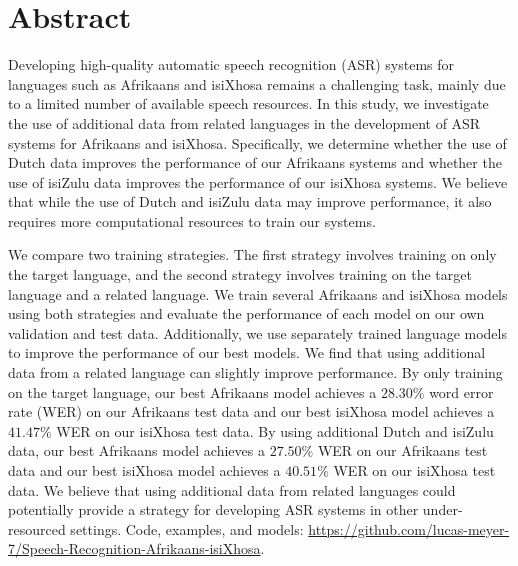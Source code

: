 \chapter*{Abstract}
\makeatletter{}\makeatother
Developing high-quality automatic speech recognition (ASR) systems for languages such as Afrikaans and isiXhosa remains a challenging task, mainly due to a limited number of available speech resources. 
In this study, we investigate the use of additional data from related languages in the development of ASR systems for Afrikaans and isiXhosa.
Specifically, we determine whether the use of Dutch data improves the performance of our Afrikaans systems
and whether the use of isiZulu data improves the performance of our isiXhosa systems.
We believe that while the use of Dutch and isiZulu data may improve performance, it also requires more computational resources to train our systems.

We compare two training strategies. The first strategy involves training on only the target language, and the second strategy 
involves training on the target language and a related language.
We train several Afrikaans and isiXhosa models using both strategies and evaluate the performance of each model on our own validation and test data.
Additionally, we use separately trained language models to improve the performance of 
our best models.
We find that using additional data from a related language can slightly improve performance.
By only training on the target language, our best Afrikaans model achieves a $28.30\%$ word error rate (WER) on our Afrikaans test data 
and our best isiXhosa model achieves a $41.47\%$ WER on our isiXhosa test data.
By using additional Dutch and isiZulu data, our best Afrikaans model achieves a $27.50\%$ WER on our Afrikaans test data
and our best isiXhosa model achieves a $40.51\%$ WER on our isiXhosa test data.
We believe that using additional data from related languages could potentially provide a strategy for developing ASR systems in other under-resourced settings.
Code, examples, and models: \href{https://github.com/lucas-meyer-7/Speech-Recognition-Afrikaans-isiXhosa}{https://github.com/lucas-meyer-7/Speech-Recognition-Afrikaans-isiXhosa}.



